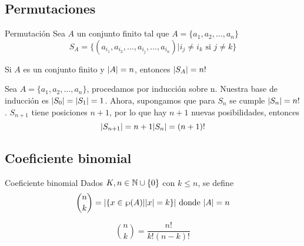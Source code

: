 	\subsection{Permutaciones}
		\begin{definition}{Permutación}
			Sea $A$ un conjunto finito tal que $A=\{a_1,a_2,\dotso,a_n\}$
			$$S_A=\{(a_{i_1},a_{i_2},\dotso,a_{i_j},\dotso,a_{i_n})|i_j\neq i_k\text{ si } j\neq k\}$$
		\end{definition}
		\begin{theorem}{}
			Si $A$ es un conjunto finito y $\abs{A}=n$, entonces $\abs{S_A}=n!$
		\end{theorem}
		\begin{demostration}{}
			Sea $A=\{a_1,a_2,\dotso,a_n\}$, procedamos por inducción sobre n.
			Nuestra base de inducción es $\abs{S_0}=\abs{S_1}=1$.
			Ahora, supongamos que para $S_n$ se cumple $\abs{S_n}=n!$.
			$S_{n+1}$ tiene posiciones $n+1$, por lo que hay $n+1$ nuevas posibilidades, entonces
			$$\abs{S_{n+1}}=n+1\abs{S_n}=(n+1)!$$
		\end{demostration}
	\subsection{Coeficiente binomial}
		\begin{definition}{Coeficiente binomial}
			Dados $K,n\in\mathbb{N}\cup\{0\}$ con $k\le n$, se define $$\binom{n}{k}=\abs{\{x\in\wp(A)|\abs{x}=k\}}\text{ donde }\abs{A}=n$$
		\end{definition}
		\begin{theorem}{}
			$$\binom{n}{k}=\frac{n!}{k!(n-k)!}$$
		\end{theorem}

